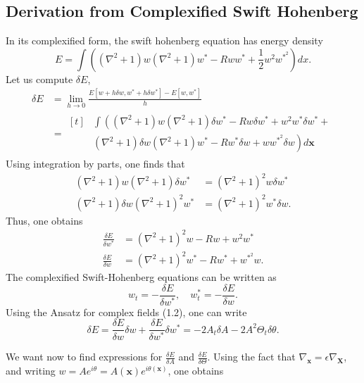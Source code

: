 \documentclass[12pt]{article}
\numberwithin{equation}{section}
\begin{document}
\subsection{Derivation from Complexified Swift Hohenberg}
\par In its complexified form, the swift hohenberg equation has energy density
\begin{equation}
E = \int \left( (\nabla^2+1)w(\nabla^2+1)w^{*}-Rww^{*}+\frac{1}{2}w^2w^{*^2}\right)dx.
\end{equation}
Let us compute $\delta E$,
\begin{align*}
\delta E &= \lim_{h \rightarrow 0}\frac{E[w+h\delta w, w^* + h\delta w^*]-E[w,w^*]}{h}\\
    &= \begin{aligned}[t]
        & \int \left( (\nabla^2+1)w(\nabla^2+1)\delta w^* -Rw\delta w^* + w^2w^*\delta w^* + \right. \\
        & \left. (\nabla^2+1)\delta w (\nabla^2+1)w^* -Rw^*\delta w + ww^{*^2}\delta w \right) d\bm{x}
    \end{aligned}
\end{align*}
Using integration by parts, one finds that
\begin{align*}
(\nabla^2+1)w(\nabla^2+1)\delta w^* &= (\nabla^2 +1)^2w\delta w^*\\
(\nabla^2+1)\delta w (\nabla^2+1)^2w^* &= (\nabla^2+1)^2w^*\delta w.
\end{align*}
Thus, one obtains
\begin{align}
\frac{\delta E}{\delta w^*} &= (\nabla^2+1)^2w - Rw + w^2w^*\\
\frac{\delta E}{\delta w} &= (\nabla^2+1)^2 w^* -Rw^* + w^{*^2}w.
\end{align}
The complexified Swift-Hohenberg equations can be written as
\begin{equation}
w_t = - \frac{\delta E}{\delta w^*}, \quad w^*_t = -\frac{\delta E}{\delta w}.
\end{equation}
Using the Ansatz for complex fields (1.2), one can write
\begin{equation}
\delta E = \frac{\delta E}{\delta w}\delta w + \frac{\delta E}{\delta w^*}\delta w^* = -2A_t\delta A - 2A^2\Theta_t \delta \theta.
\end{equation}
\par We want now to find expressions for $\frac{\delta E}{\delta A}$ and $\frac{\delta E}{\delta \Theta}$.
Using the fact that $\nabla_{\bm{x}} = \epsilon\nabla_{\bm{X}}$, and writing $w=Ae^{i\theta}=A(\bm{x})e^{i\theta(\bm{x})}$, one obtains
\end{document}
